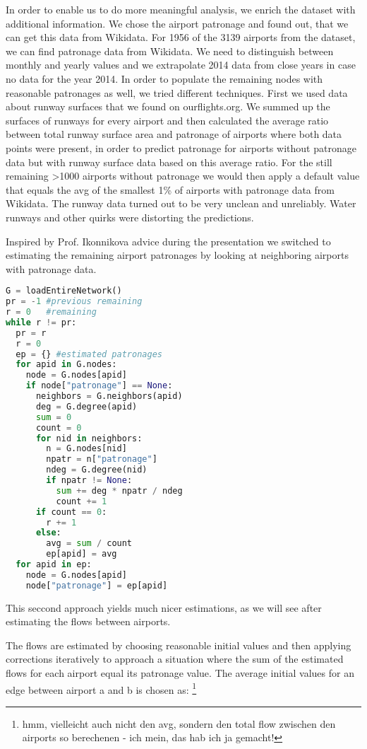 \documentclass[twocolumn]{tum-article}
\begin{document}
In order to enable us to do more meaningful analysis, we enrich the dataset with additional information. We chose the airport patronage and found out, that we can get this data from Wikidata. 
For 1956 of the 3139 airports from the dataset, we can find patronage data from Wikidata. 
We need to distinguish between monthly and yearly values and we extrapolate 2014 data from close years in case no data for the year 2014. 
In order to populate the remaining nodes with reasonable patronages as well, we tried different techniques. 
First we used data about runway surfaces that we found on ourflights.org. We summed up the surfaces of runways for every airport and then calculated the average ratio between total runway surface area and patronage of airports where both data points were present, in order to predict patronage for airports without patronage data but with runway surface data based on this average ratio. For the still remaining >1000 airports without patronage we would then apply a default value that equals the avg of the smallest 1\% of airports with patronage data from Wikidata. 
The runway data turned out to be very unclean and unreliably. Water runways and other quirks were distorting the predictions. 

Inspired by Prof. Ikonnikova advice during the presentation we switched to estimating the remaining airport patronages by looking at neighboring airports with patronage data.

\begin{lstlisting}[language=Python, caption=Patronage Estimation]
G = loadEntireNetwork()
pr = -1 #previous remaining
r = 0   #remaining
while r != pr:
  pr = r
  r = 0
  ep = {} #estimated patronages
  for apid in G.nodes:
    node = G.nodes[apid]
    if node["patronage"] == None:
      neighbors = G.neighbors(apid) 
      deg = G.degree(apid)
      sum = 0
      count = 0
      for nid in neighbors: 
        n = G.nodes[nid]
        npatr = n["patronage"]
        ndeg = G.degree(nid) 
        if npatr != None: 
          sum += deg * npatr / ndeg
          count += 1
      if count == 0:
        r += 1
      else:
        avg = sum / count
        ep[apid] = avg 
  for apid in ep: 
    node = G.nodes[apid]
    node["patronage"] = ep[apid]
\end{lstlisting}

This seccond approach yields much nicer estimations, as we will see after estimating the flows between airports. 

The flows are estimated by choosing reasonable initial values and then applying corrections iteratively to approach a situation where the sum of the estimated flows for each airport equal its patronage value.
The average initial values for an edge between airport a and b is chosen as: \footnote{hmm, vielleicht auch nicht den avg, sondern den total flow zwischen den airports so berechenen - ich mein, das hab ich ja gemacht!}
\end{document}
